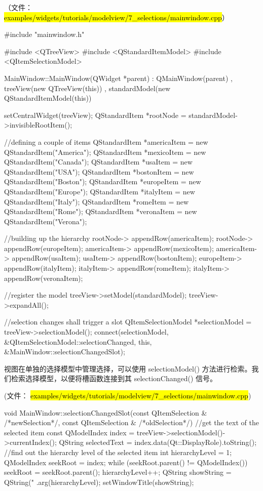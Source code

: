 （文件： \hl{examples/widgets/tutorials/modelview/7\_selections/mainwindow.cpp}）

\begin{cppcode}
#include "mainwindow.h"

#include <QTreeView>
#include <QStandardItemModel>
#include <QItemSelectionModel>

MainWindow::MainWindow(QWidget *parent)
    : QMainWindow(parent)
    , treeView(new QTreeView(this))
    , standardModel(new QStandardItemModel(this))
{
    setCentralWidget(treeView);
    QStandardItem *rootNode = standardModel->invisibleRootItem();

    //defining a couple of items
    QStandardItem *americaItem = new QStandardItem("America");
    QStandardItem *mexicoItem =  new QStandardItem("Canada");
    QStandardItem *usaItem =     new QStandardItem("USA");
    QStandardItem *bostonItem =  new QStandardItem("Boston");
    QStandardItem *europeItem =  new QStandardItem("Europe");
    QStandardItem *italyItem =   new QStandardItem("Italy");
    QStandardItem *romeItem =    new QStandardItem("Rome");
    QStandardItem *veronaItem =  new QStandardItem("Verona");

    //building up the hierarchy
    rootNode->    appendRow(americaItem);
    rootNode->    appendRow(europeItem);
    americaItem-> appendRow(mexicoItem);
    americaItem-> appendRow(usaItem);
    usaItem->     appendRow(bostonItem);
    europeItem->  appendRow(italyItem);
    italyItem->   appendRow(romeItem);
    italyItem->   appendRow(veronaItem);

    //register the model
    treeView->setModel(standardModel);
    treeView->expandAll();

    //selection changes shall trigger a slot
    QItemSelectionModel *selectionModel = treeView->selectionModel();
    connect(selectionModel, &QItemSelectionModel::selectionChanged,
            this, &MainWindow::selectionChangedSlot);
}
\end{cppcode}

视图在单独的选择模型中管理选择，可以使用 selectionModel() 方法进行检索。我们检索选择模型，以便将槽函数连接到其 selectionChanged() 信号。

(文件： \hl{examples/widgets/tutorials/modelview/7\_selections/mainwindow.cpp})

\begin{cppcode}
void MainWindow::selectionChangedSlot(const QItemSelection & /*newSelection*/, const QItemSelection & /*oldSelection*/)
{
    //get the text of the selected item
    const QModelIndex index = treeView->selectionModel()->currentIndex();
    QString selectedText = index.data(Qt::DisplayRole).toString();
    //find out the hierarchy level of the selected item
    int hierarchyLevel = 1;
    QModelIndex seekRoot = index;
    while (seekRoot.parent() != QModelIndex()) {
        seekRoot = seekRoot.parent();
        hierarchyLevel++;
    }
    QString showString = QString("%
                         .arg(hierarchyLevel);
    setWindowTitle(showString);
}
\end{cppcode}

